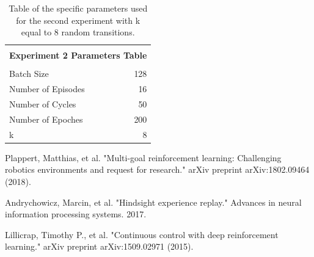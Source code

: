 \documentclass[a4paper]{report}
\begin{document}
\begin{table}[h]
\begin{center}
\begin{tabular}{|l|r|} 



\hline

\multicolumn{2}{|c|}{}\\
\multicolumn{2}{|c|}{\textbf{\large    Experiment 2 Parameters Table}}\\
\multicolumn{2}{|c|}{}\\

\hline

Batch Size 					& 128			\\
Number of Episodes			& 16			\\
Number of Cycles			& 50			\\
Number of Epoches			& 200			\\
k							& 8				\\


\hline
\end{tabular}
\end{center}
\caption{\label{exp2} Table of the specific parameters used for the second experiment with k equal to 8 random transitions.}
\end{table}



\begin{thebibliography}{}

Plappert, Matthias, et al. "Multi-goal reinforcement learning: Challenging robotics environments and request for research." arXiv preprint arXiv:1802.09464 (2018).

Andrychowicz, Marcin, et al. "Hindsight experience replay." Advances in neural information processing systems. 2017.

Lillicrap, Timothy P., et al. "Continuous control with deep reinforcement learning." arXiv preprint arXiv:1509.02971 (2015).

\end{thebibliography}
\end{document}
